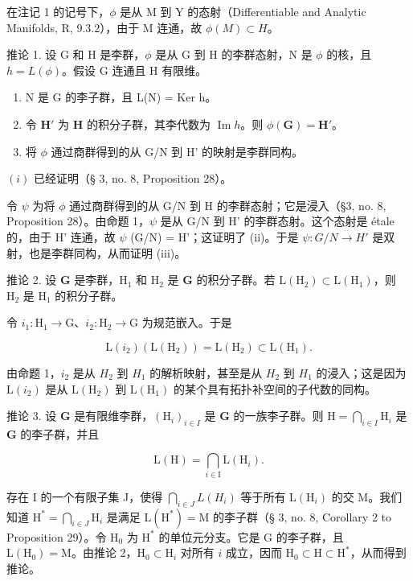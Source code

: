 在注记 1 的记号下，\(\phi\) 是从 M 到 Y 的态射（Differentiable and Analytic Manifolds, R, 9.3.2），由于 M 连通，故 \(\phi(M) \subset H\)。

推论 1. 设 G 和 H 是李群，\(\phi\) 是从 G 到 H 的李群态射，N 是 \(\phi\) 的核，且 \(h = L(\phi)\)。假设 G 连通且 H 有限维。

\begin{enumerate}
\def\labelenumi{(\roman{enumi})}
\item
  N 是 G 的李子群，且 L(N) = Ker h。
\item
  令 \(\mathbf{H}'\) 为 \(\mathbf{H}\) 的积分子群，其李代数为 \(\operatorname{Im} h\)。则 \(\phi(\mathbf{G}) = \mathbf{H}'\)。
\item
  将 \(\phi\) 通过商群得到的从 G/N 到 H' 的映射是李群同构。
\end{enumerate}

\((i)\) 已经证明（§ 3, no. 8, Proposition 28）。

令 \(\psi\) 为将 \(\phi\) 通过商群得到的从 G/N 到 H 的李群态射；它是浸入（§3, no. 8, Proposition 28）。由命题 1，\(\psi\) 是从 G/N 到 H' 的李群态射。这个态射是 étale 的，由于 H' 连通，故 \(\psi\) (G/N) = H'；这证明了 (ii)。于是 \(\psi\colon G/N \to H'\) 是双射，也是李群同构，从而证明 (iii)。

推论 2. 设 \(\mathbf{G}\) 是李群，\(\mathrm{H}_1\) 和 \(\mathrm{H}_2\) 是 \(\mathbf{G}\) 的积分子群。若 \(\mathrm{L}(\mathrm{H}_2) \subset \mathrm{L}(\mathrm{H}_1)\)，则 \(\mathrm{H}_2\) 是 \(\mathrm{H}_1\) 的积分子群。

令 \(i_1: \mathrm{H}_1 \to \mathrm{G}\)、\(i_2: \mathrm{H}_2 \to \mathrm{G}\) 为规范嵌入。于是

\[
\mathrm{L} (i _ {2}) (\mathrm{L} (\mathrm{H} _ {2})) = \mathrm{L} (\mathrm{H} _ {2}) \subset \mathrm{L} (\mathrm{H} _ {1}).
\]

由命题 1，\(i_{2}\) 是从 \(H_{2}\) 到 \(H_{1}\) 的解析映射，甚至是从 \(H_{2}\) 到 \(H_{1}\) 的浸入；这是因为 \(\mathrm{L}(i_{2})\) 是从 \(\mathrm{L}(\mathrm{H}_{2})\) 到 \(\mathrm{L}(\mathrm{H}_{1})\) 的某个具有拓扑补空间的子代数的同构。

推论 3. 设 \(\mathbf{G}\) 是有限维李群，\((\mathrm{H}_i)_{i\in I}\) 是 \(\mathbf{G}\) 的一族李子群。则 \(\mathrm{H} = \bigcap_{i\in I}\mathrm{H}_i\) 是 \(\mathbf{G}\) 的李子群，并且

\[
\mathrm{L} (\mathrm{H}) = \bigcap_ {i \in \mathrm{I}} \mathrm{L} (\mathrm{H} _ {i}).
\]

存在 I 的一个有限子集 J，使得 \(\bigcap_{i\in J}L(H_i)\) 等于所有 \(\mathrm{L}(\mathrm{H}_i)\) 的交 M。我们知道 \(\mathrm{H}^* = \bigcap_{i\in J}\mathrm{H}_i\) 是满足 \(\mathrm{L}(\mathrm{H}^*) = \mathrm{M}\) 的李子群（§ 3, no. 8, Corollary 2 to Proposition 29）。令 \(\mathrm{H}_0\) 为 \(\mathrm{H}^*\) 的单位元分支。它是 G 的李子群，且 \(\mathrm{L}(\mathrm{H}_0) = \mathrm{M}\)。由推论 2，\(\mathrm{H}_0\subset \mathrm{H}_i\) 对所有 \(i\) 成立，因而 \(\mathrm{H}_0\subset \mathrm{H}\subset \mathrm{H}^*\)，从而得到推论。

